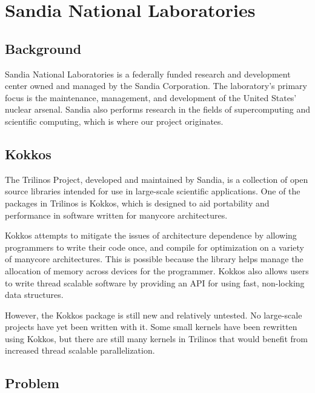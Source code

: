 
\chapter{Sandia National Laboratories}

\section{Background}

Sandia National Laboratories is a federally funded research and development
center owned and managed by the Sandia Corporation.  The laboratory's primary
focus is the maintenance, management, and development of the United States'
nuclear arsenal.  Sandia also performs research in the fields of supercomputing
and scientific computing, which is where our project originates. 

\section{Kokkos}

 The Trilinos Project, developed and maintained by
Sandia, is a collection of open source libraries intended for use in large-scale
scientific applications.
One of the packages in Trilinos is Kokkos, which is designed to aid portability
and performance in software written for manycore architectures.  

Kokkos attempts to mitigate the issues of architecture dependence 
by allowing programmers to write their
code once, and compile for optimization on a variety of manycore architectures.
This is possible because the library helps manage the allocation of memory across devices for the
programmer. Kokkos
also allows users to write thread scalable software by providing an API for
using fast, non-locking data structures.

However, the Kokkos package is still new and relatively untested.  No
large-scale projects have yet been written with it.  Some small kernels have
been rewritten using Kokkos, but there are still many kernels in Trilinos that
would benefit from increased thread scalable parallelization.

\section{Problem}

